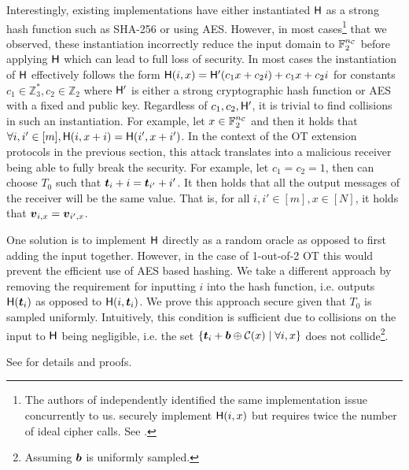 Interestingly, existing implementations\cite{libOTe,encrypto,KOS,EMP} have either instantiated $\H$ as a strong hash function such as SHA-256 or using AES. However, in most cases\footnote{\label{empNote}The authors of \cite{EMP,GKWY19} independently identified the same implementation issue concurrently to us. \cite{EMP} securely implement $\H(i,x)$ but requires twice the number of ideal cipher calls. See \cite{GKWY19}. } that we observed\cite{libOTe,encrypto,KOS}, these instantiation incorrectly reduce the input domain to $\mathbb{F}^\nc_2$ before applying $\H$ which can lead to full loss of security. In most cases the instantiation of $\H$ effectively follows the form $\H(i,x)=\H'(c_1 x + c_2 i) + c_1 x + c_2 i$ for constants $c_1\in\mathbb{Z}^*_3,c_2\in\mathbb{Z}_2$ where $\H'$ is either a strong cryptographic hash function or AES with a fixed and public key. Regardless of $c_1,c_2,\H'$, it is trivial to find collisions in such an instantiation. For example, let $x\in\mathbb{F}^\nc_2$ and then it holds that $\forall i,i'\in[m], \H(i,x+i)=\H(i', x+i')$. In the context of the OT extension protocols in the previous section, this attack translates into a malicious receiver being able to fully break the security.
\iffullversion
 For example, let $c_1=c_2=1$, then \rec can choose $T_0$ such that $\tt_i+i=\tt_{i'}+i'$. It then holds that all the output messages of the receiver will be the same value.  That is, for all $i,i'\in[m],x\in[N]$, it holds that $\vv_{i,x}=\vv_{i',x}$. 
\fi



One solution is to implement $\H$ directly as a random oracle as opposed to first adding the input together. However, in the case of 1-out-of-2 OT this would prevent the efficient use of AES based hashing. We take a different approach by removing the requirement for inputting $i$ into the hash function, i.e. \rec outputs $\H(\tt_i)$ as opposed to $\H(i,\tt_i)$. We prove this approach secure given that $T_0$ is sampled uniformly. Intuitively, this condition is sufficient due to collisions on the input to $\H$ being negligible, i.e. the set $\{\tt_i + \bb\oplus\mathcal{C}(x) \mid \forall i,x\}$ does not collide\footnote{Assuming $\bb$ is uniformly sampled.}.

See  for details and proofs.